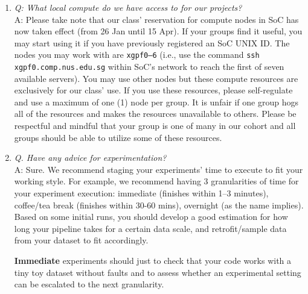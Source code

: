 \documentclass[11pt]{article}
\begin{document}
\begin{enumerate}
    \item {\it Q: What local compute do we have access to for our projects?}\\
    A: Please take note that our class' reservation for compute nodes in SoC has now taken effect (from 26 Jan until 15 Apr).  If your groups find it useful, you may start using it if you have previously registered an SoC UNIX ID. The nodes you may work with are {\tt xgpf0--6} (i.e., use the command {\tt ssh xgpf0.comp.nus.edu.sg} within SoC's network to reach the first of seven available servers).  You may use other nodes but these compute resources are exclusively for our class' use.  If you use these resources, please self-regulate and use a maximum of one (1) node per group.  It is unfair if one group hogs all of the resources and makes the resources unavailable to others.  Please be respectful and mindful that your group is one of many in our cohort and all groups should be able to utilize some of these resources.


    \item {\it Q. Have any advice for experimentation?}\\
    A: Sure. We recommend staging your experiments' time to execute to fit your working style.  For example, we recommend having 3 granularities of time for your experiment execution: immediate (finishes within 1--3 minutes), coffee/tea break (finishes within 30-60 mins), overnight (as the name implies).  Based on some initial runs, you should develop a good estimation for how long your pipeline takes for a certain data scale, and retrofit/sample data from your dataset to fit accordingly.

    {\bf Immediate} experiments should just to check that your code works with a tiny toy dataset without faults and to assess whether an experimental setting can be escalated to the next granularity.  


\end{enumerate}
\end{document}

